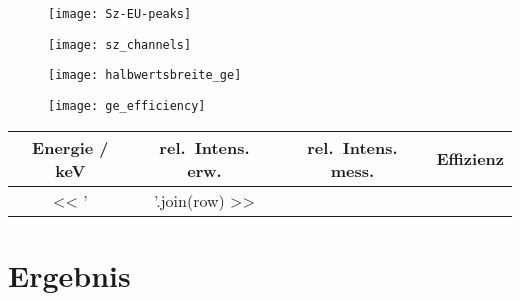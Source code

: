 \documentclass[11pt, ngerman, fleqn, DIV=15, headinclude, BCOR=2cm]{scrreprt}
\newcommand{\plotwidth}{0.8\linewidth}
\begin{document}
\begin{figure}
    \centering
    \texttt{[image: Sz-EU-peaks]}
    \caption{%
    }
    \label{fig:}
\end{figure}

\begin{figure}
    \centering
    \texttt{[image: sz\_channels]}
    \caption{%
    }
    \label{fig:sz_kanal}
\end{figure}


\begin{figure}
    \centering
    \texttt{[image: halbwertsbreite\_ge]}
    \caption{%
    }
    \label{fig:halbwertsbreite}
\end{figure}


\begin{figure}
    \centering
    \texttt{[image: ge\_efficiency]}
    \caption{%
    }
    \label{fig:effizienz}
\end{figure}

\begin{tabular}{SSSS}
    {Energie / \si{\kilo\electronvolt}} & {rel.\ Intens. erw.} & {rel.\ Intens.
mess.} & {Effizienz} \\
    \midrule
    << ' & '.join(row) >> \\
\end{tabular}

\chapter{Ergebnis}




\begin{appendix}


\end{appendix}
\end{document}
